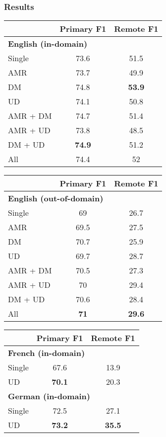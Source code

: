 \documentclass[t,handout,xcolor={svgnames}]{beamer}
\begin{document}
\begin{frame}
\frametitle{Results}
\centering
\small
\setlength\tabcolsep{3pt}
\begin{tabular}{lcc}
& \footnotesize \bf Primary F1 & \footnotesize \bf Remote F1 \\
\hline
\multicolumn{3}{l}{\small \bf English (in-domain)} \\
\footnotesize Single
& 73.6 & 51.5 \\
\cline{1-1}
\footnotesize AMR
& 73.7 & 49.9 \\
\footnotesize DM
& 74.8 & \textbf{53.9} \\
\footnotesize UD
& 74.1 & 50.8 \\
\footnotesize AMR + DM
& 74.7 & 51.4 \\
\footnotesize AMR + UD
& 73.8 & 48.5 \\
\footnotesize DM + UD
& \textbf{74.9} & 51.2 \\
\footnotesize All
& 74.4 & 52
\end{tabular}
\hfill
\begin{tabular}{lcc}
& \footnotesize \bf Primary F1 & \footnotesize \bf Remote F1 \\
\hline
\multicolumn{3}{l}{\small \bf English (out-of-domain)} \\
\footnotesize Single
& 69 & 26.7 \\
\cline{1-1}
\footnotesize AMR
& 69.5 & 27.5 \\
\footnotesize DM
& 70.7 & 25.9 \\
\footnotesize UD
& 69.7 & 28.7 \\
\footnotesize AMR + DM
& 70.5 & 27.3 \\
\footnotesize AMR + UD
& 70 & 29.4 \\
\footnotesize DM + UD
& 70.6 & 28.4 \\
\footnotesize All
& \textbf{71} & \textbf{29.6}
\end{tabular}
\vfill
\begin{tabular}{lcc}
& \footnotesize \bf Primary F1 & \footnotesize \bf Remote F1 \\
\hline
\multicolumn{3}{l}{\small \bf French (in-domain)} \\
\small Single & 67.6 & 13.9 \\
\small UD & \textbf{70.1} & 20.3 \\
\hline
\multicolumn{3}{l}{\small \bf German (in-domain)} \\
\small Single & 72.5 & 27.1 \\
\small UD & \textbf{73.2} & \textbf{35.5}
\end{tabular}
\end{frame}
\end{document}
